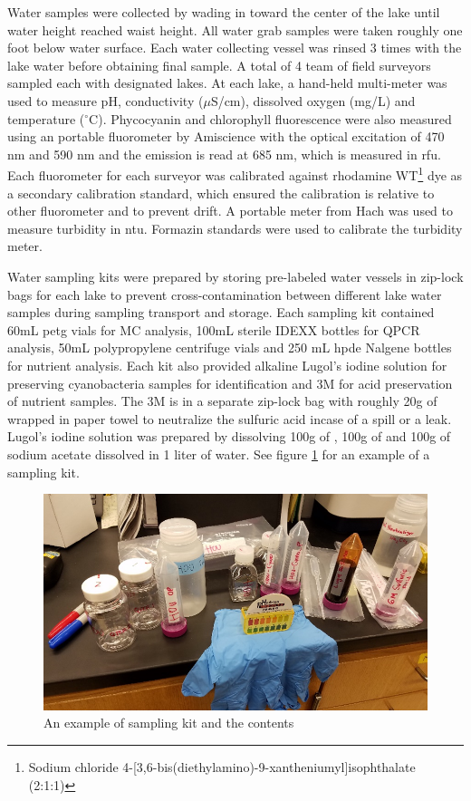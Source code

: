 Water samples were collected by wading in toward the center of the lake until water height reached waist height. All water grab samples were taken roughly one foot below water surface. Each water collecting vessel was rinsed 3 times with the lake water before obtaining final sample. A total of 4 team of field surveyors sampled each with designated lakes. At each lake, a hand-held multi-meter was used to measure pH, conductivity ($\mu$S/cm), dissolved oxygen (mg/L) and temperature ($^\circ$C). Phycocyanin and chlorophyll fluorescence were also measured using an portable fluorometer by Amiscience with the optical excitation of 470 nm and 590 nm and the emission is read at 685 nm, which is measured in \gls{rfu}. Each fluorometer for each surveyor was calibrated against rhodamine WT\footnote{Sodium chloride 4-[3,6-bis(diethylamino)-9-xantheniumyl]isophthalate (2:1:1)} dye as a secondary calibration standard, which ensured the calibration is relative to other fluorometer and to prevent drift. A portable meter from Hach was used to measure turbidity in \gls{ntu}. Formazin standards were used to calibrate the turbidity meter.

Water sampling kits were prepared by storing pre-labeled water vessels in zip-lock bags for each lake to prevent cross-contamination between different lake water samples during sampling transport and storage. Each sampling kit contained 60mL \gls{petg} vials for MC analysis, 100mL sterile IDEXX bottles for QPCR analysis, 50mL polypropylene centrifuge vials and 250 mL \gls{hpde} Nalgene bottles for nutrient analysis. Each kit also provided alkaline Lugol's iodine solution for preserving cyanobacteria samples for identification and 3M  for acid preservation of nutrient samples. The 3M  is in a separate zip-lock bag with roughly 20g of  wrapped in paper towel to neutralize the sulfuric acid incase of a spill or a leak. Lugol's iodine solution was prepared by dissolving 100g of , 100g of  and 100g of sodium acetate dissolved in 1 liter of water. See figure \ref{fig:samplekit} for an example of a sampling kit.

\begin{figure}[!h]
\includegraphics[width=\textwidth]{figures/samplekit}
\caption{An example of sampling kit and the contents}
\label{fig:samplekit}
\end{figure}

